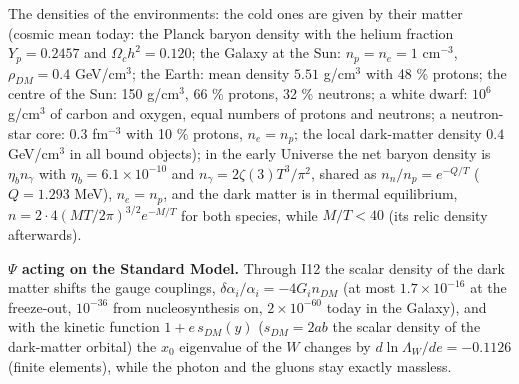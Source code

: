 \documentclass[
  10pt,
]{article}
\begin{document}
The densities of the environments: the cold ones are given by their
matter (cosmic mean today: the Planck baryon density with the helium
fraction \(Y_p = 0.2457\) and \(\Omega_ch^2 = 0.120\); the Galaxy at the
Sun: \(n_p = n_e = 1\) cm\(^{-3}\), \(\rho_{DM} = 0.4\) GeV/cm\(^3\);
the Earth: mean density \(5.51\) g/cm\(^3\) with 48 \% protons; the
centre of the Sun: 150 g/cm\(^3\), 66 \% protons, 32 \% neutrons; a
white dwarf: \(10^6\) g/cm\(^3\) of carbon and oxygen, equal numbers of
protons and neutrons; a neutron-star core: \(0.3\) fm\(^{-3}\) with 10
\% protons, \(n_e = n_p\); the local dark-matter density \(0.4\)
GeV/cm\(^3\) in all bound objects); in the early Universe the net baryon
density is \(\eta_bn_\gamma\) with \(\eta_b = 6.1\times10^{-10}\) and
\(n_\gamma = 2\zeta(3)T^3/\pi^2\), shared as \(n_n/n_p = e^{-Q/T}\)
(\(Q = 1.293\) MeV), \(n_e = n_p\), and the dark matter is in thermal
equilibrium, \(n = 2\cdot4(MT/2\pi)^{3/2}e^{-M/T}\) for both species,
while \(M/T < 40\) (its relic density afterwards).

\textbf{\(\Psi\) acting on the Standard Model.} Through I12 the scalar
density of the dark matter shifts the gauge couplings,
\(\delta\alpha_i/\alpha_i = -4G_in_{DM}\) (at most \(1.7\times10^{-16}\)
at the freeze-out, \(10^{-36}\) from nucleosynthesis on,
\(2\times10^{-60}\) today in the Galaxy), and with the kinetic function
\(1 + e\,s_{DM}(y)\) (\(s_{DM} = 2ab\) the scalar density of the
dark-matter orbital) the \(x_0\) eigenvalue of the \(W\) changes by
\(d\ln\Lambda_W/de = -0.1126\) (finite elements), while the photon and
the gluons stay exactly massless.
\end{document}

